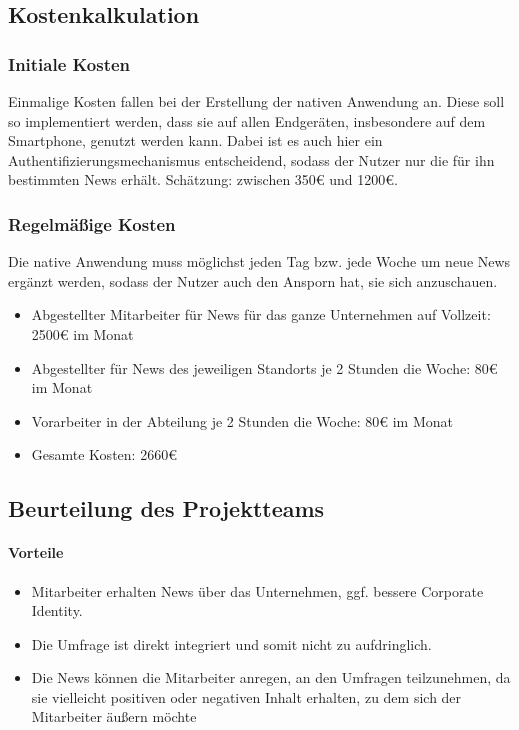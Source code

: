 \subsection{Kostenkalkulation}

\subsubsection{Initiale Kosten}

Einmalige Kosten fallen bei der Erstellung der nativen Anwendung an. Diese soll so implementiert werden, dass sie auf allen Endgeräten, insbesondere auf dem Smartphone, genutzt werden kann. Dabei ist es auch hier ein Authentifizierungsmechanismus entscheidend, sodass der Nutzer nur die für ihn bestimmten News erhält.
Schätzung: zwischen 350€ und 1200€.

\subsubsection{Regelmäßige Kosten}

Die native Anwendung muss möglichst jeden Tag bzw. jede Woche um neue News ergänzt werden, sodass der Nutzer auch den Ansporn hat, sie sich anzuschauen. 

\begin{itemize}
\item Abgestellter Mitarbeiter für News für das ganze Unternehmen auf Vollzeit:	2500€ im Monat
\item Abgestellter für News des jeweiligen Standorts je 2 Stunden die Woche:	80€ im Monat
\item Vorarbeiter in der Abteilung je 2 Stunden die Woche:	80€ im Monat
\item Gesamte Kosten:	2660€
\end{itemize}


\subsection{Beurteilung des Projektteams}

\paragraph{Vorteile}

\begin{itemize}
\item	Mitarbeiter erhalten News über das Unternehmen, ggf. bessere Corporate Identity.
\item Die Umfrage ist direkt integriert und somit nicht zu aufdringlich.
\item Die News können die Mitarbeiter anregen, an den Umfragen teilzunehmen, da sie vielleicht positiven oder negativen Inhalt erhalten, zu dem sich der Mitarbeiter äußern möchte
\end{itemize}

